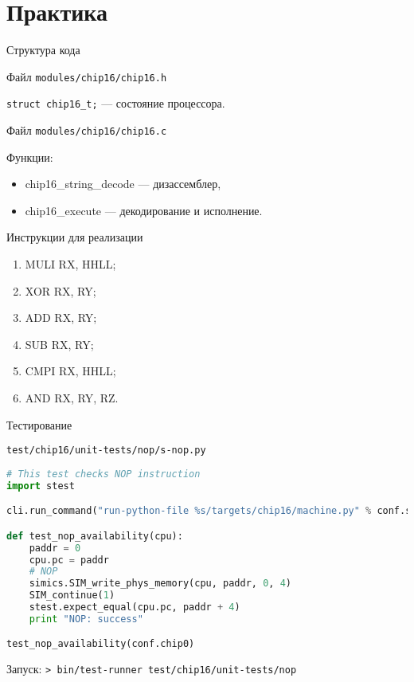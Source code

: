 \ifilab
\section{Практика}

\begin{frame}{Структура кода}

Файл \texttt{modules/chip16/chip16.h}

\texttt{struct chip16\_t;} --- состояние процессора.

\pause\bigskip

Файл \texttt{modules/chip16/chip16.c}

Функции:

\begin{itemize}
    \item chip16\_string\_decode --- дизассемблер,
    \item chip16\_execute --- декодирование и исполнение.
\end{itemize}

\end{frame}

\begin{frame}{Инструкции для реализации}

\begin{enumerate}
    \item MULI RX, HHLL;
    \item XOR RX, RY;
    \item ADD RX, RY;
    \item SUB RX, RY;
    \item CMPI RX, HHLL;
    \item AND RX, RY, RZ.
\end{enumerate}

\end{frame}

\begin{frame}[fragile]{Тестирование}

\texttt{test/chip16/unit-tests/nop/s-nop.py}

\begin{lstlisting}[language=python, basicstyle=\scriptsize]
# This test checks NOP instruction
import stest

cli.run_command("run-python-file %s/targets/chip16/machine.py" % conf.sim.workspace)

def test_nop_availability(cpu):
    paddr = 0
    cpu.pc = paddr
    # NOP
    simics.SIM_write_phys_memory(cpu, paddr, 0, 4)
    SIM_continue(1)
    stest.expect_equal(cpu.pc, paddr + 4)
    print "NOP: success"

test_nop_availability(conf.chip0)
\end{lstlisting}

Запуск: \texttt{> bin/test-runner test/chip16/unit-tests/nop}

\end{frame}
\fi

